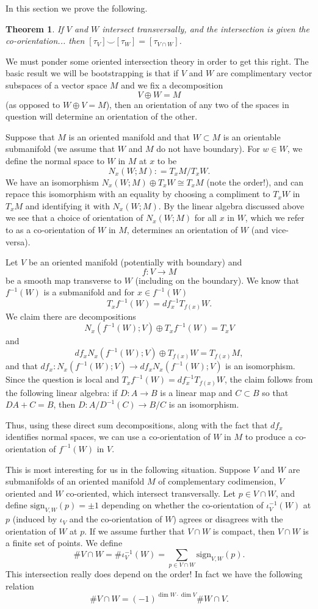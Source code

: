 \documentclass{amsart}          %
\newtheorem{theorem}{Theorem}
\begin{document}
In this section we prove the following.

\begin{theorem}
If $V$ and $W$ intersect transversally, and the intersection is given the co-orientation... then $[\tau_{V}] \smile [\tau_W] = [\tau_{V \cap W}]$.
\end{theorem}

We must ponder some oriented intersection theory in order to get this right. The basic result we will be bootstrapping is that if $V$ and $W$ are complimentary vector subspaces of a vector space $M$ and we fix a decomposition
\[
V\oplus W = M
\]
(as opposed to $W\oplus V= M$), then an orientation of any two of the spaces in question will determine an orientation of the other. 

Suppose that $M$ is an oriented manifold and that $W\subset M$ is an orientable submanifold (we assume that $W$ and $M$ do not have boundary). For $w\in W$, we define the normal space to $W$ in $M$ at $x$ to be 
\[
N_x(W; M) : = T_xM/T_xW.
\]
We have an isomorphism $N_x(W; M)\oplus T_xW\cong T_xM$ (note the order!), and can repace this isomorphism with an equality by choosing a compliment to $T_xW$ in $T_xM$ and identifying it with $N_x(W; M)$. By the linear algebra discussed above we see that a choice of orientation of $N_x(W; M)$ for all $x$ in $W$, which we refer to as a co-orientation of $W$ in $M$, determines an orientation of $W$ (and vice-versa). 

Let $V$ be an oriented manifold (potentially with boundary) and 
\[
f: V\rightarrow M
\]
be a smooth map transverse to $W$ (including on the boundary). We know that $f^{-1}(W)$ is a submanifold and for $x\in f^{-1}(W)$
\[
T_xf^{-1}(W) = df_x^{-1}T_{f(x)}W.
\]
We claim there are decompositions
\[
N_x(f^{-1}(W); V)\oplus T_xf^{-1}(W)= T_xV
\]
and
\[
df_xN_x(f^{-1}(W); V) \oplus T_{f(x)}W = T_{f(x)}M,
\]
and that $df_x: N_x(f^{-1}(W); V)\rightarrow df_xN_x(f^{-1}(W); V)$ is an isomorphism. Since the question is local and $T_xf^{-1}(W) = df_x^{-1}T_{f(x)}W$, the claim follows from the following linear algebra: if $D: A\rightarrow B$ is a linear map and $C\subset B$ so that $DA+ C= B$, then $D: A/D^{-1}(C)\rightarrow B/C$ is an isomorphism. 

Thus, using these direct sum decompositions, along with the fact that $df_x$ identifies normal spaces, we can use a co-orientation of $W$ in $M$ to produce a co-orientation of $f^{-1}(W)$ in $V$. 

This is most interesting for us in the following situation. Suppose $V$ and $W$ are submanifolds of an oriented manifold $M$ of complementary codimension, $V$ oriented and $W$ co-oriented, which intersect transversally. Let $p \in V\cap W$, and define $\text{sign}_{V,W}(p) = \pm 1$ depending on whether the co-orientation of $\iota_V^{-1}(W)$ at $p$ (induced by $\iota_V$ and the co-orientation of $W$) agrees or disagrees with the orientation of $W$ at $p$.  If we assume further that $V\cap W$ is compact, then $V\cap W$ is a finite set of points. We define 
\[
\#V\cap W = \#\iota_V^{-1}(W) = \sum_{p\in V\cap W}\text{sign}_{V, W}(p).
\]
This intersection really does depend on the order! In fact we have the following relation
\[
\#V\cap W = (-1)^{\dim W\cdot \dim V} \#W\cap V.
\]
\end{document}
